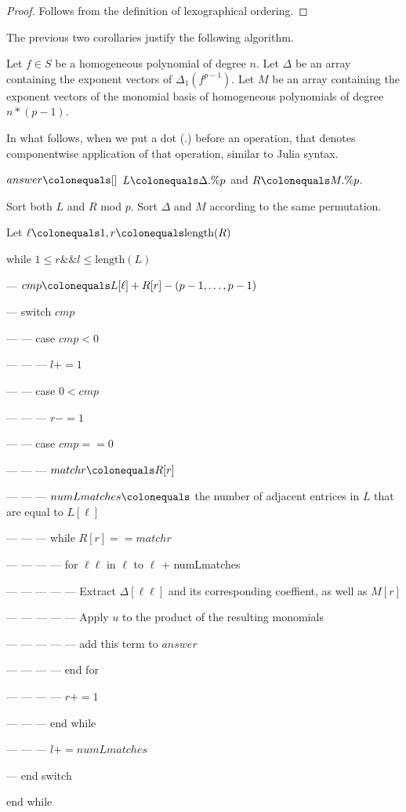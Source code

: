 \begin{proof}
	Follows from the definition of lexographical
	ordering.
\end{proof}

The previous two corollaries justify
the following algorithm.

\begin{cxt}
	Let \(f \in S\) be a homogeneous
	polynomial of degree \(n\).
	Let \(\Delta\) be an array containing the 
	exponent vectors of \(\Delta_{1}(f^{p-1})\).
	Let \(M\) be an array containing the exponent
	vectors of the monomial basis of
	homogeneous polynomials of degree
	\(n*(p-1)\).
\end{cxt}

In what follows, when we put a dot (\(.\))
before an operation, that denotes
componentwise application
of that operation, similar to Julia syntax.

\begin{alg}
	\(answer \colonequals []\)
	\(L \colonequals \Delta .\% p\) 
	and \(R \colonequals M .\% p\).

	Sort both \(L\) and \(R\) mod \(p\).
	Sort \(\Delta\) and \(M\) according to the 
	same permutation.

	Let \(\ell \colonequals 1, r \colonequals \text{length}(R)\)

	while \(1 \leq r \&\& l \leq \text{length}(L)\)

	--- \(cmp \colonequals L[\ell] + R[r] - (p-1, \ldots, p-1)\)

	--- switch \(cmp\)

	--- --- case  \(cmp < 0\) 

	--- --- --- \(l += 1\) 

	--- --- case \(0 < cmp\) 

	--- --- --- \(r -= 1\) 

	--- --- case \(cmp == 0\) 

	--- --- --- \(matchr \colonequals R[r]\) 

    --- --- --- \(numLmatches \colonequals \) the number of
	adjacent entrices in \(L\) that are equal to \(L[\ell]\)

	--- --- --- while \(R[r] == matchr\) 

	--- --- --- --- for \(\ell\ell\) in \(\ell\) to \(\ell\) + numLmatches

	--- --- --- --- --- Extract \(\Delta[\ell\ell]\) 
	and its corresponding coeffient,
	as well as \(M[r]\)

	--- --- --- --- --- Apply \(u\) to the product
	of the resulting monomials

	--- --- --- --- --- add this term to \(answer\)

	--- --- --- ---  end for

	--- --- --- --- \(r += 1\) 

	--- --- --- end while

	--- --- --- \(l += numLmatches\) 
	
	--- end switch

	end while

\end{alg}

